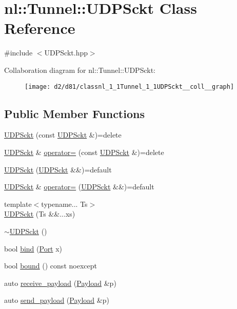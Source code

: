 \hypertarget{classnl_1_1Tunnel_1_1UDPSckt}{}\section{nl\+:\+:Tunnel\+:\+:U\+D\+P\+Sckt Class Reference}
\label{classnl_1_1Tunnel_1_1UDPSckt}


{\ttfamily \#include $<$U\+D\+P\+Sckt.\+hpp$>$}



Collaboration diagram for nl\+:\+:Tunnel\+:\+:U\+D\+P\+Sckt\+:
\nopagebreak
\begin{figure}[H]
\begin{center}
\leavevmode
\texttt{[image: d2/d81/classnl\_1\_1Tunnel\_1\_1UDPSckt\_\_coll\_\_graph]}
\end{center}
\end{figure}
\subsection*{Public Member Functions}
\begin{DoxyCompactItemize}
\item 
\hyperlink{classnl_1_1Tunnel_1_1UDPSckt_ae2905cbd51a64c571d7847e868b29eba}{U\+D\+P\+Sckt} (const \hyperlink{classnl_1_1Tunnel_1_1UDPSckt}{U\+D\+P\+Sckt} \&)=delete
\item 
\hyperlink{classnl_1_1Tunnel_1_1UDPSckt}{U\+D\+P\+Sckt} \& \hyperlink{classnl_1_1Tunnel_1_1UDPSckt_a6622374dc9af5d04dffbf18ffb211f43}{operator=} (const \hyperlink{classnl_1_1Tunnel_1_1UDPSckt}{U\+D\+P\+Sckt} \&)=delete
\item 
\hyperlink{classnl_1_1Tunnel_1_1UDPSckt_ac3167b9903ea4357169a667d9009ecd1}{U\+D\+P\+Sckt} (\hyperlink{classnl_1_1Tunnel_1_1UDPSckt}{U\+D\+P\+Sckt} \&\&)=default
\item 
\hyperlink{classnl_1_1Tunnel_1_1UDPSckt}{U\+D\+P\+Sckt} \& \hyperlink{classnl_1_1Tunnel_1_1UDPSckt_a4867218ded004b7fdead9b15ad00a7d1}{operator=} (\hyperlink{classnl_1_1Tunnel_1_1UDPSckt}{U\+D\+P\+Sckt} \&\&)=default
\item 
{\footnotesize template$<$typename... Ts$>$ }\\\hyperlink{classnl_1_1Tunnel_1_1UDPSckt_a08d6dd02697f8b6bf3db55cb6b73abc9}{U\+D\+P\+Sckt} (Ts \&\&...xs)
\item 
\hyperlink{classnl_1_1Tunnel_1_1UDPSckt_ab538c9897acaabe02e70a0e4974b8530}{$\sim$\+U\+D\+P\+Sckt} ()
\item 
bool \hyperlink{classnl_1_1Tunnel_1_1UDPSckt_aac80aee48ea0383c90f480c7e089a81e}{bind} (\hyperlink{namespacenl_a12899c87e239db66809da0a71fcc9129}{Port} x)
\item 
bool \hyperlink{classnl_1_1Tunnel_1_1UDPSckt_ab83d20c0ad6584be632f3fc975df3e5c}{bound} () const  noexcept
\item 
auto \hyperlink{classnl_1_1Tunnel_1_1UDPSckt_a772e7359f5faa75fb326adf560e4ce43}{receive\+\_\+payload} (\hyperlink{structnl_1_1Payload}{Payload} \&p)
\item 
auto \hyperlink{classnl_1_1Tunnel_1_1UDPSckt_a7b6f61fb3bc6b0ff99887e9bec691d48}{send\+\_\+payload} (\hyperlink{structnl_1_1Payload}{Payload} \&p)
\end{DoxyCompactItemize}


